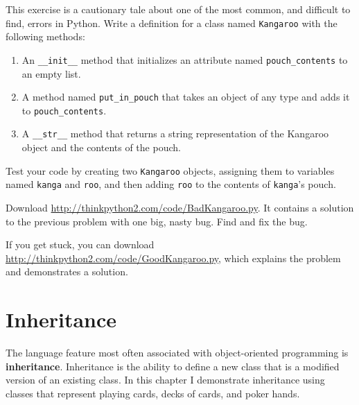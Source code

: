 \documentclass[10pt]{book}
\begin{document}
\begin{exercise}
\label{kangaroo}

This exercise is a cautionary tale about one of the most
common, and difficult to find, errors in Python.
Write a definition for a class named {\tt Kangaroo} with the following
methods:

\begin{enumerate}

\item An \verb"__init__" method that initializes an attribute named 
\verb"pouch_contents" to an empty list.

\item A method named \verb"put_in_pouch" that takes an object
of any type and adds it to \verb"pouch_contents".

\item A \verb"__str__" method that returns a string representation
of the Kangaroo object and the contents of the pouch.

\end{enumerate}
%
Test your code 
by creating two {\tt Kangaroo} objects, assigning them to variables
named {\tt kanga} and {\tt roo}, and then adding {\tt roo} to the
contents of {\tt kanga}'s pouch.

Download \url{http://thinkpython2.com/code/BadKangaroo.py}.  It contains
a solution to the previous problem with one big, nasty bug.
Find and fix the bug.

If you get stuck, you can download
\url{http://thinkpython2.com/code/GoodKangaroo.py}, which explains the
problem and demonstrates a solution.

\end{exercise}



\chapter{Inheritance}

The language feature most often associated with object-oriented
programming is {\bf inheritance}.  Inheritance is the ability to
define a new class that is a modified version of an existing class.
In this chapter I demonstrate inheritance using classes that represent
playing cards, decks of cards, and poker hands.
\end{document}
